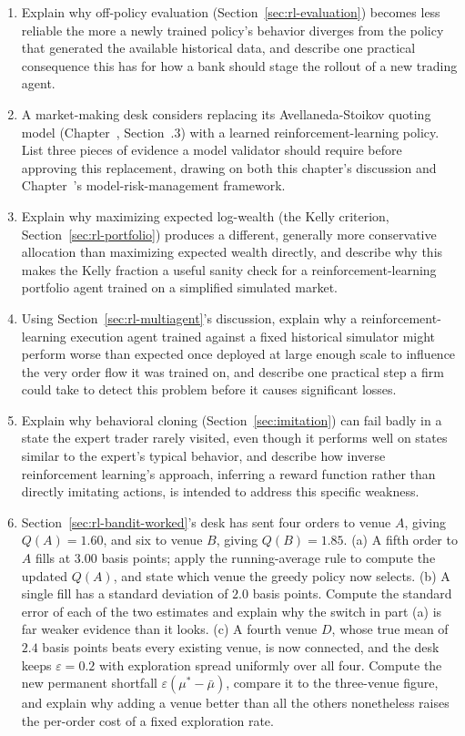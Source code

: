 \documentclass[../ai_in_finance]{subfiles}
\begin{document}
\begin{enumerate}[exercises]
    \item Explain why off-policy evaluation (Section~\ref{sec:rl-evaluation}) becomes less reliable the more a newly trained policy's behavior diverges from the policy that generated the available historical data, and describe one practical consequence this has for how a bank should stage the rollout of a new trading agent.
    \item A market-making desk considers replacing its Avellaneda-Stoikov quoting model (Chapter~, Section~.3) with a learned reinforcement-learning policy. List three pieces of evidence a model validator should require before approving this replacement, drawing on both this chapter's discussion and Chapter~'s model-risk-management framework.
    \item Explain why maximizing expected log-wealth (the Kelly criterion, Section~\ref{sec:rl-portfolio}) produces a different, generally more conservative allocation than maximizing expected wealth directly, and describe why this makes the Kelly fraction a useful sanity check for a reinforcement-learning portfolio agent trained on a simplified simulated market.
    \item Using Section~\ref{sec:rl-multiagent}'s discussion, explain why a reinforcement-learning execution agent trained against a fixed historical simulator might perform worse than expected once deployed at large enough scale to influence the very order flow it was trained on, and describe one practical step a firm could take to detect this problem before it causes significant losses.
    \item Explain why behavioral cloning (Section~\ref{sec:imitation}) can fail badly in a state the expert trader rarely visited, even though it performs well on states similar to the expert's typical behavior, and describe how inverse reinforcement learning's approach, inferring a reward function rather than directly imitating actions, is intended to address this specific weakness.
    \item Section~\ref{sec:rl-bandit-worked}'s desk has sent four orders to venue $A$, giving $Q(A)=1.60$, and six to venue $B$, giving $Q(B)=1.85$. (a) A fifth order to $A$ fills at $3.00$ basis points; apply the running-average rule to compute the updated $Q(A)$, and state which venue the greedy policy now selects. (b) A single fill has a standard deviation of $2.0$ basis points. Compute the standard error of each of the two estimates and explain why the switch in part (a) is far weaker evidence than it looks. (c) A fourth venue $D$, whose true mean of $2.4$ basis points beats every existing venue, is now connected, and the desk keeps $\varepsilon=0.2$ with exploration spread uniformly over all four. Compute the new permanent shortfall $\varepsilon(\mu^{*}-\bar{\mu})$, compare it to the three-venue figure, and explain why adding a venue better than all the others nonetheless raises the per-order cost of a fixed exploration rate.

\end{enumerate}
\end{document}
